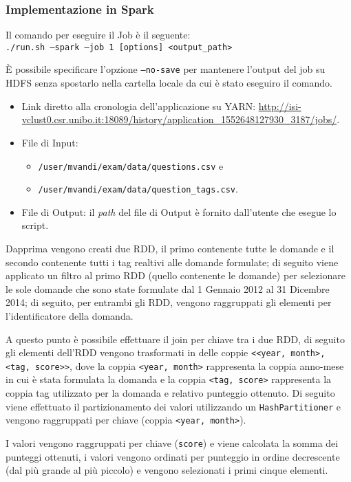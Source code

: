 \documentclass[10pt]{article}
\begin{document}
\subsubsection{Implementazione in  Spark}
Il comando per eseguire il Job è il seguente:\\
\texttt{./run.sh --spark --job 1 [options] <output\_path>}

\`E possibile specificare l'opzione \texttt{--no-save} per mantenere l'output del job su HDFS senza spostarlo nella cartella locale da cui è stato eseguiro il comando.

\begin{itemize}
\item Link diretto alla cronologia dell'applicazione su YARN: \url{http://isi-vclust0.csr.unibo.it:18089/history/application_1552648127930_3187/jobs/}.
\item File di Input:
\begin{itemize}
\item \texttt{/user/mvandi/exam/data/questions.csv} e\\
\item \texttt{/user/mvandi/exam/data/question\_tags.csv}.
\end{itemize}
\item File di Output: il \textit{path} del file di Output è fornito dall'utente che esegue lo script.
\end{itemize}

Dapprima vengono creati due RDD, il primo contenente tutte le domande e il secondo contenente tutti i tag realtivi alle domande formulate; di seguito viene applicato un filtro al primo RDD (quello contenente le domande) per selezionare le sole domande che sono state formulate dal 1 Gennaio 2012 al 31 Dicembre 2014; di seguito, per entrambi gli RDD, vengono raggruppati gli elementi per l'identificatore della domanda.

A questo punto è possibile effettuare il join per chiave tra i due RDD, di seguito gli elementi dell'RDD vengono trasformati in delle coppie \texttt{<<year, month>, <tag, score>>}, dove la coppia \texttt{<year, month>} rappresenta la coppia anno-mese in cui è stata formulata la domanda e la coppia \texttt{<tag, score>} rappresenta la coppia tag utilizzato per la domanda e relativo punteggio ottenuto. Di seguito viene effettuato il partizionamento dei valori utilizzando un \texttt{HashPartitioner} e vengono raggruppati per chiave (coppia \texttt{<year, month>}).

I valori vengono raggruppati per chiave (\texttt{score}) e viene calcolata la somma dei punteggi ottenuti, i valori vengono ordinati per punteggio in ordine decrescente (dal più grande al più piccolo) e vengono selezionati i primi cinque elementi.
\end{document}
